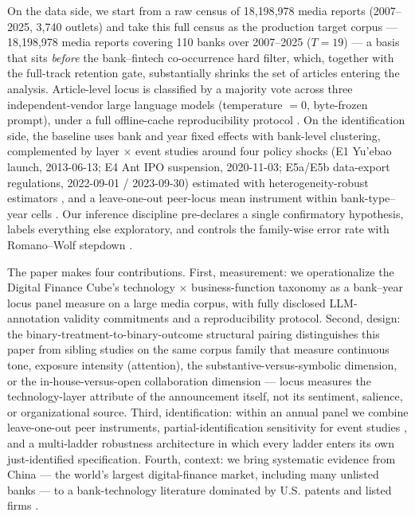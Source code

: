 On the data side, we start from a raw census of 18{,}198{,}978 media reports (2007--2025,
3{,}740 outlets) and take this full census as the production target corpus ---
18{,}198{,}978 media reports covering 110 banks over
2007--2025 ($T=19$) — a basis that sits \emph{before} the bank--fintech co-occurrence
hard filter, which, together with the full-track retention gate, substantially shrinks
the set of articles entering the analysis. Article-level locus is classified by a
majority vote across three independent-vendor large language models (temperature $=0$,
byte-frozen prompt), under a full offline-cache reproducibility protocol
\parencite{ludwig2025llmecon,carlson2026llmannotation}. On the identification side, the
baseline uses bank and year fixed effects with bank-level clustering, complemented by
layer $\times$ event studies around four policy shocks (E1 Yu'ebao launch, 2013-06-13;
E4 Ant IPO suspension, 2020-11-03; E5a/E5b data-export regulations, 2022-09-01 /
2023-09-30) estimated with heterogeneity-robust estimators
\parencite{sunabraham2021eventstudy,borusyak2024revisiting,callaway2021difference}, and
a leave-one-out peer-locus mean instrument within bank-type--year cells
\parencite{manski1993reflection,leary2014peereffects}. Our inference discipline
pre-declares a single confirmatory hypothesis, labels everything else exploratory, and
controls the family-wise error rate with Romano--Wolf stepdown
\parencite{romanowolf2005stepdown}.

The paper makes four contributions. First, measurement: we operationalize the Digital
Finance Cube's technology $\times$ business-function taxonomy as a bank--year locus panel
measure on a large media corpus, with fully disclosed LLM-annotation validity commitments
and a reproducibility protocol. Second, design: the binary-treatment-to-binary-outcome
structural pairing distinguishes this paper from sibling studies on the same corpus
family that measure continuous tone, exposure intensity (attention), the
substantive-versus-symbolic dimension, or the in-house-versus-open collaboration
dimension — locus measures the technology-layer attribute of the announcement itself,
not its sentiment, salience, or organizational source. Third, identification: within an
annual panel we combine leave-one-out peer instruments, partial-identification
sensitivity for event studies \parencite{rambachan2023honestdid}, and a multi-ladder
robustness architecture in which every ladder enters its own just-identified
specification. Fourth, context: we bring systematic evidence from China — the world's
largest digital-finance market, including many unlisted banks — to a bank-technology
literature dominated by U.S. patents and listed firms
\parencite{chen2019fintechvalue,lerner2024finpatents}.

